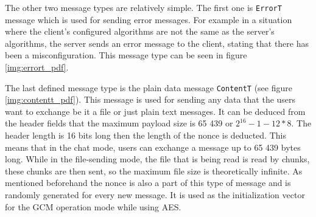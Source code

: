 The other two message types are relatively simple. The first one is \texttt{ErrorT} message which is used for sending error messages. For example in a situation where the client's configured algorithms are not the same as the server's algorithms, the server sends an error message to the client, stating that there has been a misconfiguration. This message type can be seen in figure \ref{img:errort_pdf}.

The last defined message type is the plain data message \texttt{ContentT} (see figure \ref{img:contentt_pdf}). This message is used for sending any data that the users want to exchange be it a file or just plain text messages. It can be deduced from the header fields that the maximum payload size is 65 439 or $2^{16}-1-12*8$. The header length is 16 bits long then the length of the nonce is deducted. This means that in the chat mode, users can exchange a message up to 65 439 bytes long. While in the file-sending mode, the file that is being read is read by chunks, these chunks are then sent, so the maximum file size is theoretically infinite. As mentioned beforehand the nonce is also a part of this type of message and is randomly generated for every new message. It is used as the initialization vector for the GCM operation mode while using AES.

